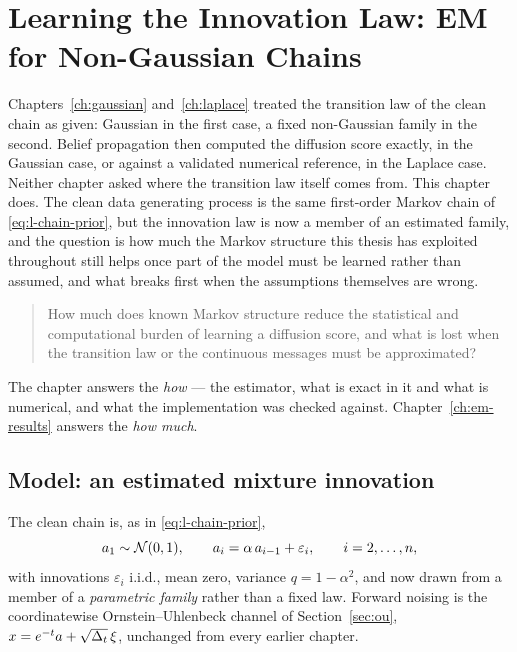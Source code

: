%

\chapter{Learning the Innovation Law: EM for Non-Gaussian Chains}
\label{ch:em-method}

Chapters~\ref{ch:gaussian} and~\ref{ch:laplace} treated the transition law of
the clean chain as given: Gaussian in the first case, a fixed non-Gaussian
family in the second. Belief propagation then computed the diffusion score
exactly, in the Gaussian case, or against a validated numerical reference, in
the Laplace case. Neither chapter asked where the transition law itself comes
from. This chapter does. The clean data generating process is the same
first-order Markov chain of \eqref{eq:l-chain-prior}, but the innovation law
is now a member of an estimated family, and the question is how much the
Markov structure this thesis has exploited throughout still helps once part of
the model must be learned rather than assumed, and what breaks first when the
assumptions themselves are wrong.

\begin{quote}
How much does known Markov structure reduce the statistical and computational
burden of learning a diffusion score, and what is lost when the transition law
or the continuous messages must be approximated?
\end{quote}

The chapter answers the \emph{how} --- the estimator, what is exact in it and
what is numerical, and what the implementation was checked against.
Chapter~\ref{ch:em-results} answers the \emph{how much}.

\section{Model: an estimated mixture innovation}\label{sec:em-model}

The clean chain is, as in \eqref{eq:l-chain-prior},
\begin{equation}
  a_1 \sim \mathcal{N}(0,1), \qquad a_i = \alpha\, a_{i-1} + \varepsilon_i,
  \qquad i = 2,\dots,n,
  \label{eq:em-chain}
\end{equation}
with innovations $\varepsilon_i$ i.i.d., mean zero, variance
$q = 1-\alpha^2$, and now drawn from a member of a \emph{parametric family}
rather than a fixed law. Forward noising is the coordinatewise
Ornstein--Uhlenbeck channel of Section~\ref{sec:ou},
$x = e^{-t} a + \sqrt{\Delta_t}\,\xi$, unchanged from every earlier chapter.

